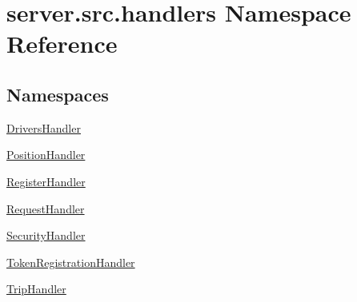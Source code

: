 \hypertarget{namespaceserver_1_1src_1_1handlers}{}\section{server.\+src.\+handlers Namespace Reference}
\label{namespaceserver_1_1src_1_1handlers}
\subsection*{Namespaces}
\begin{DoxyCompactItemize}
\item 
 \hyperlink{namespaceserver_1_1src_1_1handlers_1_1_drivers_handler}{Drivers\+Handler}
\item 
 \hyperlink{namespaceserver_1_1src_1_1handlers_1_1_position_handler}{Position\+Handler}
\item 
 \hyperlink{namespaceserver_1_1src_1_1handlers_1_1_register_handler}{Register\+Handler}
\item 
 \hyperlink{namespaceserver_1_1src_1_1handlers_1_1_request_handler}{Request\+Handler}
\item 
 \hyperlink{namespaceserver_1_1src_1_1handlers_1_1_security_handler}{Security\+Handler}
\item 
 \hyperlink{namespaceserver_1_1src_1_1handlers_1_1_token_registration_handler}{Token\+Registration\+Handler}
\item 
 \hyperlink{namespaceserver_1_1src_1_1handlers_1_1_trip_handler}{Trip\+Handler}
\end{DoxyCompactItemize}
